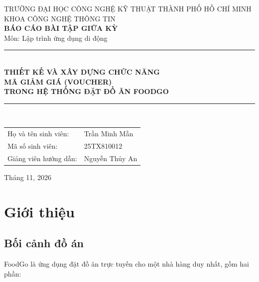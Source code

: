 \documentclass[12pt,a4paper]{article}
\title{}
\date{}
\begin{document}
\begin{titlepage}
    \centering
    \vspace*{1.5cm}

    {\fontsize{13}{15}\selectfont TRƯỜNG ĐẠI HỌC CÔNG NGHỆ KỸ THUẬT THÀNH PHỐ HỒ CHÍ MINH}\\
    {\large KHOA CÔNG NGHỆ THÔNG TIN}\\[2.5cm]

    {\Large\bfseries BÁO CÁO BÀI TẬP GIỮA KỲ}\\[0.3cm]
    {\large Môn: Lập trình ứng dụng di động}\\[1.5cm]

    \rule{0.8\textwidth}{0.6pt}\\[0.4cm]
    {\LARGE\bfseries THIẾT KẾ VÀ XÂY DỰNG CHỨC NĂNG\\[0.2cm]
    MÃ GIẢM GIÁ (VOUCHER)\\[0.2cm]
    TRONG HỆ THỐNG ĐẶT ĐỒ ĂN FOODGO}\\[0.4cm]
    \rule{0.8\textwidth}{0.6pt}\\[2cm]

    \begin{flushright}
        \begin{tabular}{ll}
            Họ và tên sinh viên: & Trần Minh Mẫn \\
            Mã số sinh viên: & 25TX810012 \\
            Giảng viên hướng dẫn: & Nguyễn Thủy An \\
        \end{tabular}
    \end{flushright}

    \vfill
    {\large Tháng 11, 2026}
\end{titlepage}

\tableofcontents
\newpage

\section{Giới thiệu}

\subsection{Bối cảnh đồ án}

FoodGo là ứng dụng đặt đồ ăn trực tuyến cho một nhà hàng duy nhất, gồm hai phần:
\end{document}
